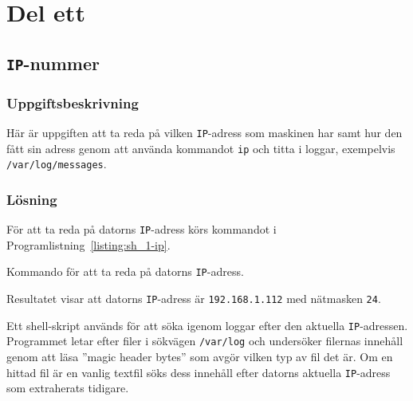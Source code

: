 %
%
%


\section{Del ett}


\subsection{\texttt{IP}-nummer}
\subsubsection{Uppgiftsbeskrivning}
Här är uppgiften att ta reda på vilken \texttt{IP}-adress som maskinen har samt
hur den fått sin adress genom att använda kommandot \texttt{ip} och titta i
loggar, exempelvis \texttt{/var/log/messages}.


\subsubsection{Lösning}
För att ta reda på datorns \texttt{IP}-adress körs kommandot i
Programlistning~\ref{listing:sh_1-ip}.

\begin{listing}[H]
  \caption{Kommando för att ta reda på datorns \texttt{IP}-adress.}
  \label{listing:sh_1-ip}
\end{listing}

Resultatet visar att datorns \texttt{IP}-adress är \texttt{192.168.1.112}
med nätmasken \texttt{24}.

Ett shell-skript används för att söka igenom loggar efter den aktuella
\texttt{IP}-adressen. Programmet letar efter filer i sökvägen \texttt{/var/log}
och undersöker filernas innehåll genom att läsa ''magic header bytes'' som
avgör vilken typ av fil det är. Om en hittad fil är en vanlig textfil söks dess
innehåll efter datorns aktuella \texttt{IP}-adress som extraherats tidigare.

